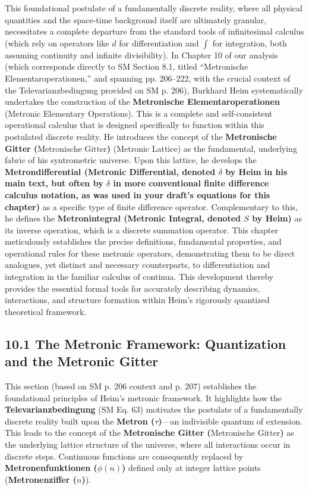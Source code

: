 \documentclass[12pt]{article}
\newcommand{\q}[1]{\enquote{#1}}
\newcommand{\metron}{\tau}
\newcommand{\metronischegitter}{\text{Metronische Gitter}}
\newcommand{\metrondifferential}{\delta}
\newcommand{\metronintegral}{S}
\newcommand{\metronenfunktion}{\phi(n)}
\newcommand{\metronenziffer}{n}
\begin{document}
This foundational postulate of a fundamentally discrete reality, where all physical quantities and the space-time background itself are ultimately granular, necessitates a complete departure from the standard tools of infinitesimal calculus (which rely on operators like \( d \) for differentiation and \( \int \) for integration, both assuming continuity and infinite divisibility). In Chapter 10 of our analysis (which corresponds directly to SM Section 8.1, titled \q{Metronische Elementaroperationen,} and spanning pp. 206–222, with the crucial context of the Televarianzbedingung provided on SM p. 206), Burkhard Heim systematically undertakes the construction of the \textbf{Metronische Elementaroperationen} (Metronic Elementary Operations). This is a complete and self-consistent operational calculus that is designed specifically to function within this postulated discrete reality. He introduces the concept of the \textbf{Metronische Gitter (\(\metronischegitter\))} (Metronic Lattice) as the fundamental, underlying fabric of his syntrometric universe. Upon this lattice, he develops the \textbf{Metrondifferential (Metronic Differential, denoted \( \metrondifferential \) by Heim in his main text, but often by \( \delta \) in more conventional finite difference calculus notation, as was used in your draft's equations for this chapter)} as a specific type of finite difference operator. Complementary to this, he defines the \textbf{Metronintegral (Metronic Integral, denoted \( \metronintegral \) by Heim)} as its inverse operation, which is a discrete summation operator. This chapter meticulously establishes the precise definitions, fundamental properties, and operational rules for these metronic operators, demonstrating them to be direct analogues, yet distinct and necessary counterparts, to differentiation and integration in the familiar calculus of continua. This development thereby provides the essential formal tools for accurately describing dynamics, interactions, and structure formation within Heim’s rigorously quantized theoretical framework.

\subsection{10.1 The Metronic Framework: Quantization and the Metronic Gitter}
\label{sec:metronic_framework}

This section (based on SM p. 206 context and p. 207) establishes the foundational principles of Heim's metronic framework. It highlights how the \textbf{Televarianzbedingung} (SM Eq. 63) motivates the postulate of a fundamentally discrete reality built upon the \textbf{Metron (\(\metron\))}—an indivisible quantum of extension. This leads to the concept of the \textbf{Metronische Gitter (\(\metronischegitter\))} as the underlying lattice structure of the universe, where all interactions occur in discrete steps. Continuous functions are consequently replaced by \textbf{Metronenfunktionen (\(\metronenfunktion\))} defined only at integer lattice points (\textbf{Metronenziffer (\(\metronenziffer\))}).
\end{document}
